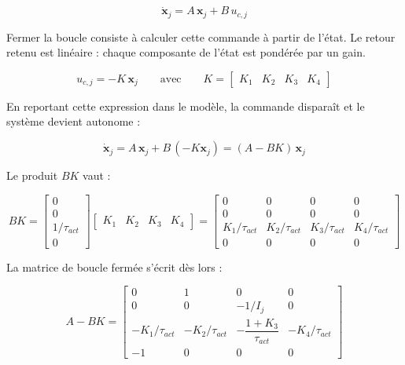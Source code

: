 \begin{equation}
    \dot{\boldsymbol x}_j = A\,\boldsymbol x_j + B\,u_{c,j}
\end{equation}

Fermer la boucle consiste à calculer cette commande à partir de l'état. Le retour retenu est linéaire : chaque composante de l'état est pondérée par un gain.

\begin{equation}
    u_{c,j} = -K\,\boldsymbol x_j
    \qquad \text{avec} \qquad
    K = \begin{bmatrix} K_1 & K_2 & K_3 & K_4 \end{bmatrix}
    \label{eq:Changementucj}
\end{equation}

En reportant cette expression dans le modèle, la commande disparaît et le système devient autonome :

\begin{equation}
    \dot{\boldsymbol x}_j = A\,\boldsymbol x_j + B\,(-K\boldsymbol x_j)
    = (A - BK)\,\boldsymbol x_j
\end{equation}

Le produit $BK$ vaut :

\begin{equation}
    BK = \begin{bmatrix} 0 \\ 0 \\ 1/\tau_{act} \\ 0 \end{bmatrix}
    \begin{bmatrix} K_1 & K_2 & K_3 & K_4 \end{bmatrix}
    = \begin{bmatrix}
        0              & 0              & 0              & 0 \\
        0              & 0              & 0              & 0 \\
        K_1/\tau_{act} & K_2/\tau_{act} & K_3/\tau_{act}
                       & K_4/\tau_{act}                      \\
        0              & 0              & 0              & 0
    \end{bmatrix}
\end{equation}

La matrice de boucle fermée s'écrit dès lors :

\begin{equation}
    A - BK = \begin{bmatrix}
        0               & 1                            & 0               & 0 \\
        0               & 0                            & -1/I_j          & 0 \\
        -K_1/\tau_{act} & -K_2/\tau_{act}
                        & -\dfrac{1 + K_3}{\tau_{act}} & -K_4/\tau_{act}     \\
        -1              & 0                            & 0               & 0
    \end{bmatrix}
    \label{eq:ABK}
\end{equation}

